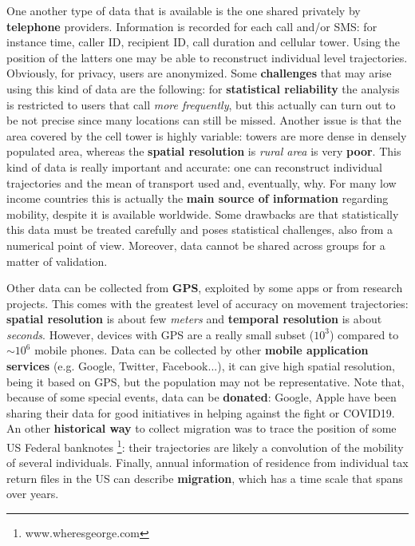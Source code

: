\documentclass[../main/main.tex]{subfiles}
\begin{document}
One another type of data that is available is the one shared privately by \textbf{telephone} providers. Information is recorded for each call and/or SMS: for instance time, caller ID, recipient ID, call duration and cellular tower. Using the position of the latters one may be able to reconstruct individual level trajectories. Obviously, for privacy, users are anonymized. Some \textbf{challenges} that may arise using this kind of data are the following: for \textbf{statistical reliability} the analysis is restricted to users that call \textit{more frequently}, but this actually can turn out to be not precise since many locations can still be missed. Another issue is that the area covered by the cell tower is highly variable: towers are more dense in densely populated area, whereas the \textbf{spatial resolution} is \textit{rural area} is very \textbf{poor}. This kind of data is really important and accurate: one can reconstruct individual trajectories and the mean of transport used and, eventually, why. For many low income countries this is actually the \textbf{main source of information} regarding mobility, despite it is available worldwide. Some drawbacks are that statistically this data must be treated carefully and poses statistical challenges, also from a numerical point of view. Moreover, data cannot be shared across groups for a matter of validation.

Other data can be collected from \textbf{GPS}, exploited by some apps or from research projects. This comes with the greatest level of accuracy on movement trajectories: \textbf{spatial resolution} is about few \textit{meters} and \textbf{temporal resolution} is about \textit{seconds}. However, devices with GPS are a really small subset ($10^3$) compared to $\sim 10^6$ mobile phones. Data can be collected by other \textbf{mobile application services} (e.g. Google, Twitter, Facebook...), it can give high spatial resolution, being it based on GPS, but the population may not be representative. Note that, because of some special events, data can be \textbf{donated}: Google, Apple have been sharing their data for good initiatives in helping against the fight or COVID19. An other \textbf{historical way} to collect migration was to trace the position of some US Federal banknotes \footnote{www.wheresgeorge.com}: their trajectories are likely a convolution of the mobility of several individuals. Finally, annual information of residence from individual tax return files in the US can describe \textbf{migration}, which has a time scale that spans over years.
\end{document}
